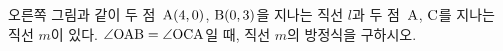 \noindent\begin{minipage}[t]{0.58\linewidth}\vspace{0pt}\raggedright 오른쪽 그림과 같이 두 점~$\mathrm{A}(4{,}\mkern3mu\mathopen{}0)$, $\mathrm{B}(0{,}\mkern3mu\mathopen{}3)$을 지나는 직선 $l$과 두 점~$\mathrm{A}$, $\mathrm{C}$를 지나는 직선 $m$이 있다. $\angle\mathrm{OAB}=\angle\mathrm{OCA}$일 때, 직선 $m$의 방정식을 구하시오. \end{minipage}\hfill\begin{minipage}[t]{0.4\linewidth}\vspace{0pt}\centering \resizebox{\ifdim\width>\linewidth\linewidth\else\width\fi}{!}{}\end{minipage}\par
